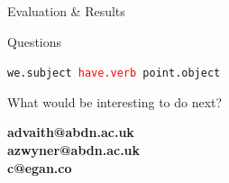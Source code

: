 \documentclass{beamer}
\begin{document}
  \begin{frame}{Evaluation \& Results}
	\begin{center}
	\end{center}
  \end{frame}

  \begin{frame}{Questions}
    \begin{center}
      \texttt{we.subject \textcolor{red}{have.verb} point.object}

      What would be interesting to do next?

      \vfill
      \begin{center}
        \textbf{advaith@abdn.ac.uk} \\ \textbf{azwyner@abdn.ac.uk} \\ \textbf{c@egan.co}
      \end{center}
    \end{center}
  \end{frame}
\end{document}
